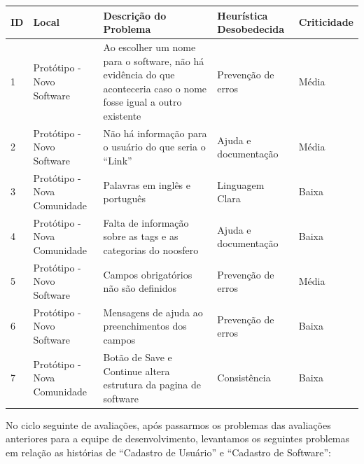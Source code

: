 \begin{table}[h!]
\begin{tabular}{|l|p{3cm}|p{6cm}|p{3cm}|l|}
\hline
\textbf{ID} & \textbf{Local} & \textbf{Descrição do Problema}                                                                                     & \textbf{Heurística Desobedecida} & \textbf{Criticidade} \\ \hline
1           & Protótipo - Novo Software                 & Ao escolher um nome para o software, não há evidência do que aconteceria caso o nome fosse igual a outro existente & Prevenção de erros               & Média                \\ \hline
2           & Protótipo - Novo Software                 & Não há informação para o usuário do que seria o ``Link''                                                             & Ajuda e documentação             & Média                \\ \hline
3           & Protótipo - Nova Comunidade               & Palavras em inglês e português                                                                                     & Linguagem Clara                   & Baixa                \\ \hline
4           & Protótipo - Nova Comunidade               & Falta de informação sobre as tags e as categorias do noosfero                                                      & Ajuda e documentação             & Baixa                \\ \hline
5           & Protótipo - Novo Software                 & Campos obrigatórios não são definidos                                                                              & Prevenção de erros               & Média                \\ \hline
6           & Protótipo - Novo Software    & Mensagens de ajuda ao preenchimentos dos campos                                                                    & Prevenção de erros               & Baixa                \\ \hline
7           & Protótipo - Nova Comunidade               & Botão de Save e Continue altera estrutura da pagina de software                                                    & Consistência                     & Baixa                \\ \hline
\end{tabular}
\end{table}

No ciclo seguinte de avaliações, após passarmos os problemas das avaliações anteriores para a equipe de desenvolvimento, levantamos os seguintes problemas em relação as histórias de ``Cadastro de Usuário'' e ``Cadastro de Software'':

